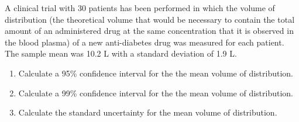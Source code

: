 \documentclass[twoside]{book}\usepackage[]{graphicx}\usepackage[]{xcolor}
\begin{document}
\begin{problem}
A clinical trial with 30 patients has been performed in
which the volume of distribution 
(the theoretical volume that would be necessary to contain the total 
amount of an administered drug at the same concentration that it is observed 
in the blood plasma) of a new anti-diabetes drug 
was measured for each patient.  The sample mean was 10.2 L with a 
standard deviation of 1.9 L.
\begin{enumerate}
\item
Calculate a 95\% confidence interval
for the the mean volume of distribution.
\item
Calculate a 99\% confidence interval
for the the mean volume of distribution.
\item
Calculate the standard uncertainty for the mean volume of distribution.
\end{enumerate}
\end{problem}
\end{document}
